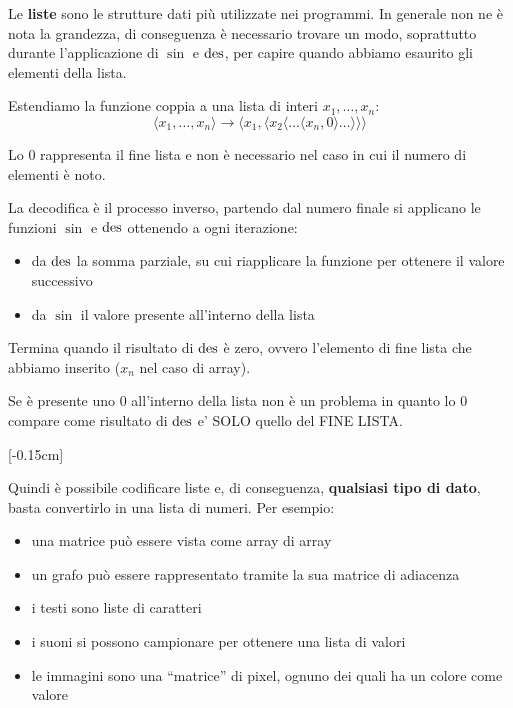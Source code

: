 Le \textbf{liste} sono le strutture dati più utilizzate nei programmi. In generale non ne è nota la grandezza, di conseguenza è necessario trovare un modo, soprattutto durante l'applicazione di $\sin$ e $\operatorname{des}$, per capire quando abbiamo esaurito gli elementi della lista.

Estendiamo la funzione coppia a una lista di interi $x_1, \dots, x_n$:
$$ \langle x_1, \dots, x_n \rangle \rightarrow \langle x_1, \langle x_2 \langle \dots \langle x_n, 0 \rangle \dots \rangle \rangle \rangle $$

Lo $0$ rappresenta il fine lista e non è necessario nel caso in cui il numero di elementi è noto.

La decodifica è il processo inverso, partendo dal numero finale si applicano le funzioni $\sin$ e $\operatorname{des}$ ottenendo a ogni iterazione: 
\begin{itemize}
	\item da $\operatorname{des}$ la somma parziale, su cui riapplicare la funzione per ottenere il valore successivo
	\item da $\sin$ il valore presente all'interno della lista
\end{itemize} 
Termina quando il risultato di $\operatorname{des}$ è zero, ovvero l'elemento di fine lista che abbiamo inserito ($x_n$ nel caso di array).
\begin{center}
	
\end{center}
Se è presente uno 0 all'interno della lista non è un problema in quanto lo 0 compare come risultato di $\operatorname{des}$ e' SOLO quello del FINE LISTA.

[-0.15cm]

Quindi è possibile codificare liste e, di conseguenza, \textbf{qualsiasi tipo di dato}, basta convertirlo in una lista di numeri. Per esempio:
\begin{itemize}
	\item una matrice può essere vista come array di array
	\item un grafo può essere rappresentato tramite la sua matrice di adiacenza
	\item i testi sono liste di caratteri
	\item i suoni si possono campionare per ottenere una lista di valori
	\item le immagini sono una ``matrice'' di pixel, ognuno dei quali ha un colore come valore
\end{itemize}

